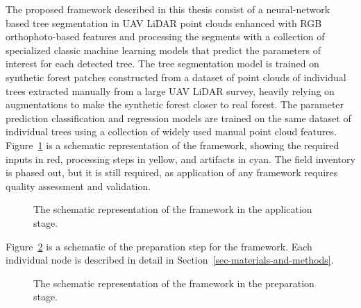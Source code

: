 The proposed framework described in this thesis consist of a neural-network based tree segmentation in UAV LiDAR point clouds enhanced with RGB orthophoto-based features and processing the segments with a collection of specialized classic machine learning models that predict the parameters of interest for each detected tree.
The tree segmentation model is trained on synthetic forest patches constructed from a dataset of point clouds of individual trees extracted manually from a large UAV LiDAR survey, heavily relying on augmentations to make the synthetic forest closer to real forest.
The parameter prediction classification and regression models are trained on the same dataset of individual trees using a collection of widely used manual point cloud features.
Figure~\ref{fig-framework-apply} is a schematic representation of the framework, showing the required inputs in red, processing steps in yellow, and artifacts in cyan.
The field inventory is phased out, but it is still required, as application of any framework requires quality assessment and validation.


\begin{figure}
\caption[Schematic representation of the framework: application]{\label{fig-framework-apply}The schematic representation of the
framework in the application stage.}
\end{figure}

Figure~\ref{fig-framework-prepare} is a schematic of the preparation step for the framework.
Each individual node is described in detail in Section~\ref{sec-materials-and-methods}.


\begin{figure}
\caption[Schematic representation of the framework: preparetion]{\label{fig-framework-prepare}The schematic representation of
the framework in the preparation stage.}
\end{figure}

